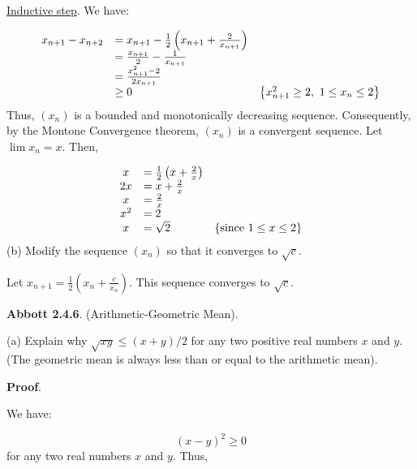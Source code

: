 \documentclass[10pt]{article}
\begin{document}
\underline{Inductive step}. We have:


\begin{equation*}
\begin{array}{ c l c }
x_{n+1} -x_{n+2} & =x_{n+1} -\frac{1}{2}\left( x_{n+1} +\frac{2}{x_{n+1}}\right) & \\
 & =\frac{x_{n+1}}{2} -\frac{1}{x_{n+1}} & \\
 & =\frac{x_{n+1}^{2} -2}{2x_{n+1}} & \\
 & \geq 0 & \left\{x_{n+1}^{2} \geq 2,\ 1\leq x_{n} \leq 2\right\}
\end{array}
\end{equation*}
Thus, $\displaystyle ( x_{n})$ is a bounded and monotonically decreasing sequence. Consequently, by the Montone Convergence theorem, $\displaystyle ( x_{n})$ is a convergent sequence. Let $\displaystyle \lim x_{n} =x$. Then,




\begin{equation*}
\begin{array}{ c l c }
x & =\frac{1}{2}\left( x+\frac{2}{x}\right) & \\
2x & =x+\frac{2}{x} & \\
x & =\frac{2}{x} & \\
x^{2} & =2 & \\
x & =\sqrt{2} & \left\{\text{since } 1\leq x\leq 2\right\}
\end{array}
\end{equation*}
(b) Modify the sequence $\displaystyle ( x_{n})$ so that it converges to $\displaystyle \sqrt{c} .$



Let $\displaystyle x_{n+1} =\frac{1}{2}\left( x_{n} +\frac{c}{x_{n}}\right)$. This sequence converges to $\displaystyle \sqrt{c}$.

\textbf{Abbott 2.4.6}. (Arithmetic-Geometric Mean).

(a) Explain why $\displaystyle \sqrt{xy} \leq ( x+y) /2$ for any two positive real numbers $\displaystyle x$ and $\displaystyle y$. (The geometric mean is always less than or equal to the arithmetic mean).



\textbf{Proof}.

We have:


\begin{equation*}
( x-y)^{2} \geq 0
\end{equation*}
for any two real numbers $\displaystyle x$ and $\displaystyle y$. Thus,
\end{document}

